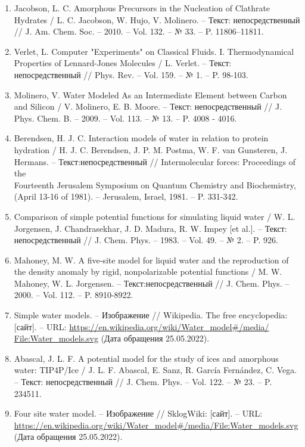 \begin{enumerate}
    \item Jacobson, L. C. Amorphous Precursors in the Nucleation of Clathrate Hydrates / L. C. Jacobson, W. Hujo, V. Molinero. -- Текст: непосредственный // J. Am. Chem. Soc. --  2010. -- Vol. 132. -- № 33. -- P. 11806–11811.
    \item Verlet, L. Computer "Experiments" on Classical Fluids. I. Thermodynamical Properties of Lennard-Jones Molecules / L. Verlet. -- Текст: непосредственный // Phys. Rev. -- Vol. 159. -- № 1. -- P. 98-103.
    \item Molinero, V. Water Modeled As an Intermediate Element between Carbon and Silicon / V. Molinero, E. B. Moore. -- Текст: непосредственный // J. Phys. Chem. B. -- 2009. -- Vol. 113. -- № 13. -- P. 4008 - 4016.
    \item Berendsen, H. J. C. Interaction models of water in relation to protein hydration / H. J. C. Berendsen, J. P. M. Postma, W. F. van Gunsteren, J. Hermans. -- Текст:непосредственный // Intermolecular forces: Proceedings of the \\ Fourteenth Jerusalem Symposium on Quantum Chemistry and Biochemistry, (April 13-16 of 1981). -- Jerusalem, Israel, 1981. -- P. 331-342.
    \item Comparison of simple potential functions for simulating liquid water / W. L. Jorgensen, J. Chandrasekhar, J. D. Madura, R. W. Impey [et al.]. -- Текст: непосредственный // J. Chem. Phys. -- 1983. -- Vol. 49. -- № 2. -- P. 926.
    \item Mahoney, M. W. A five-site model for liquid water and the reproduction of the density anomaly by rigid, nonpolarizable potential functions / M. W. Mahoney, W. L. Jorgensen. -- Текст:непосредственный // J. Chem. Phys. -- 2000. -- Vol. 112. -- P. 8910-8922.
    \item Simple water models. -- Изображение // Wikipedia. The free encyclopedia: [сайт]. -- URL: \url{https://en.wikipedia.org/wiki/Water_model#/media/} \\ \url{File:Water_models.svg} (Дата обращения 25.05.2022).
    \item Abascal, J. L. F. A potential model for the study of ices and amorphous water: TIP4P/Ice / J. L. F. Abascal, E. Sanz, R. García Fernández, C. Vega. -- Текст: непосредственный // J. Chem. Phys. -- Vol. 122. -- № 23. -- P. 234511.
    \item Four site water model. -- Изображение // SklogWiki: [сайт]. -- URL: \url{https://en.wikipedia.org/wiki/Water_model#/media/File:Water_models.svg} (Дата обращения 25.05.2022).

\end{enumerate}
